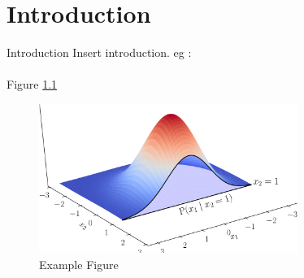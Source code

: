 \documentclass[../PhD_Dissertation.tex]{subfiles}
\begin{document}
\chapter{Introduction}{Introduction}
Insert introduction. \gls{eg} \cite{nmpc_book}:
\\\newline
\lipsum[2-4]
\\\newline
Figure \ref{fig: example_figure}
\begin{figure}[h]
  \centering
\includegraphics[width=0.75\textwidth]{Figures/conditional_gaussian.pdf}
  \caption{Example Figure} \label{fig: example_figure}
\end{figure}
\end{document}
